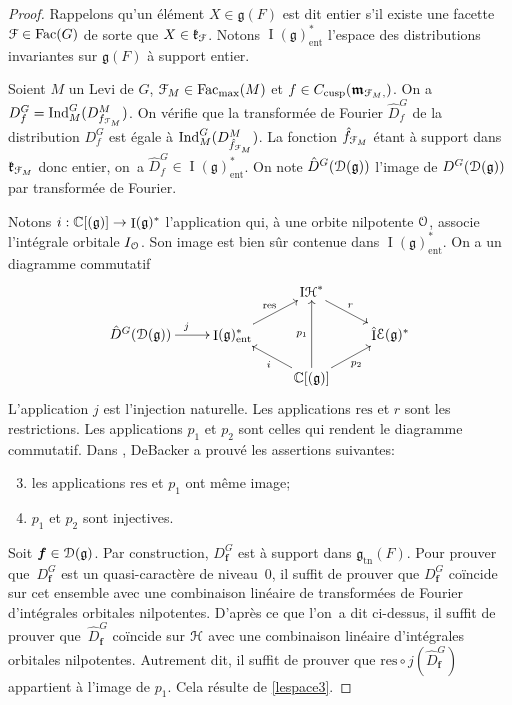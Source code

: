 \documentclass[11pt]{article}
\numberwithin{equation}{section}\providecommand{\og}{«\,}\providecommand{\fg}{\,»}
\let\mathcal \EuScript
\newcommand{\NoChangel}[1]{%
\expandafter\let\csname old\string#1\endcsname=#1
\let#1=\relax
\newcommand{#1}{\mathcode`l="716C\csname old\string#1\endcsname\mathcode`l="7160 }%
}
\newcommand{\frg}{\mathfrak{g}}
\newcommand{\frk}{\mathfrak{k}}
\newcommand{\mfrm}{\mathfrak{m}}
\newcommand{\cusp}{\mathrm{cusp}}
\newcommand{\ent}{\mathrm{ent}}
\newcommand{\Fac}{\mathrm{Fac}}
\newcommand{\Ind}{\mathrm{Ind}}
\newcommand{\nil}{\mathrm{nil}} \NoChangel{\nil}
\newcommand{\Nil}{\mathrm{Nil}} \NoChangel{\Nil}
\newcommand{\res}{\mathrm{res}}
\newcommand{\tn}{\mathrm{tn}}
\DeclareMathOperator{\rI}{I}
\DeclareMathOperator{\rIH}{I\cH}
\newcommand{\bmf}{\boldsymbol{f}}
\newcommand{\cD}{\mathcal{D}}
\newcommand{\cE}{\mathcal{E}}
\newcommand{\cF}{\mathcal{F}}
\newcommand{\cH}{\mathcal{H}}
\newcommand{\cO}{\mathcal{O}}
\newcommand{\CC}{\mathbb{C}}
\theoremstyle{plain}
\theoremstyle{definition}
\begin{document}
\begin{proof}
Rappelons qu'un élément $X\in \frg(F)$ est dit entier s'il existe une facette $\cF\in \Fac(G)$ de sorte que $X\in \frk_{\cF}$. Notons $\rI(\frg)^*_{\ent}$ l'espace des distributions invariantes sur $\frg(F)$ à support entier.

Soient $M$ un Levi de $G$, $\cF_{M}\in \Fac_{\max}(M)$ et $f\in C_{\cusp}(\boldsymbol{\mfrm}_{\cF_{M},\nil})$. On a $D^G_{f}=\Ind_{M}^G(D^M_{f_{\cF_{M}}})$. On vérifie que la transformée de Fourier $\hat{D}^G_{f}$ de la distribution $D^G_{f}$ est égale à $ \Ind_{M}^G(D^M_{\hat{f}_{\cF_{M}}})$. La fonction $\hat{f}_{\cF_{M}}$ étant à support dans $\frk_{\cF_{M}}$ donc entier, on~a $\hat{D}^G_{f}\in \rI(\frg)^*_{\ent}$. On note $\hat{D}^G(\cD(\frg))$ l'image de $D^G(\cD(\frg))$ par transformée de Fourier.

Notons $i:\CC[\Nil(\frg)]\to \rI(\frg)^*$ l'application qui, à une orbite nilpotente $\cO$, associe l'intégrale orbitale $I_{\cO}$. Son image est bien sûr contenue dans $\rI(\frg)^*_{\ent}$. On a un diagramme commutatif
\[
\xymatrix@R=.5cm{
&&\rIH^*\ar[dr]^-r&\\
\hat{D}^G(\cD(\frg))\ar[r]^{j}&\rI(\frg)^*_{\ent}\ar[ru]^-{\res}&&\hat{\rI}\cE(\frg)^*\\
&&\CC[\Nil(\frg)]\ar[ul]^-i\ar[uu]^-{p_{1}}\ar[ur]_-{p_2}&
}
\]
L'application $j$ est l'injection naturelle. Les applications $\res$ et $r$ sont les restrictions. Les applications $p_{1}$ et $p_{2}$ sont celles qui rendent le diagramme commutatif. Dans \hbox{\cite[Th.\,2.1.5]{D}}, DeBacker a prouvé les assertions suivantes:
\begin{enumerate}\setcounter{enumi}{2}
\item\label{lespace3}
les applications $\res$ et $p_{1}$ ont même image;

\item\label{lespace4}
$p_{1}$ et $p_{2}$ sont injectives.
\end{enumerate}

Soit $\bmf\in \cD(\frg)$. Par construction, $D^G_{\bmf}$ est à support dans $\frg_{\tn}(F)$. Pour prouver que~$D^G_{\bmf}$ est un quasi-caractère de niveau~$0$, il suffit de prouver que $D^G_{\bmf}$ coïncide sur cet ensemble avec une combinaison linéaire de transformées de Fourier d'intégrales orbitales nilpotentes. D'après ce que l'on~a dit ci-dessus, il suffit de prouver que~$\hat{D}^G_{\bmf}$ coïncide sur $\cH$ avec une combinaison linéaire d'intégrales orbitales nilpotentes. Autrement dit, il suffit de prouver que $\res\circ j(\hat{D}^G_{\bmf})$ appartient à l'image de $p_{1}$. Cela résulte de \eqref{lespace3}.


\end{proof}
\end{document}
